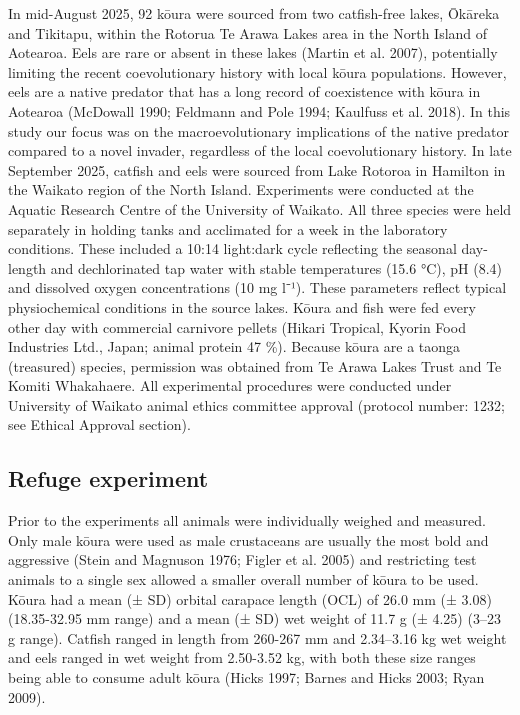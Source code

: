 \documentclass[
  12pt,
  a4paper,
  oneside]{scrbook}
\begin{document}
In mid-August 2025, 92 kōura were sourced from two catfish-free lakes,
Ōkāreka and Tikitapu, within the Rotorua Te Arawa Lakes area in the
North Island of Aotearoa. Eels are rare or absent in these lakes (Martin
et al. 2007), potentially limiting the recent coevolutionary history
with local kōura populations. However, eels are a native predator that
has a long record of coexistence with kōura in Aotearoa (McDowall 1990;
Feldmann and Pole 1994; Kaulfuss et al. 2018). In this study our focus
was on the macroevolutionary implications of the native predator
compared to a novel invader, regardless of the local coevolutionary
history. In late September 2025, catfish and eels were sourced from Lake
Rotoroa in Hamilton in the Waikato region of the North Island.
Experiments were conducted at the Aquatic Research Centre of the
University of Waikato. All three species were held separately in holding
tanks and acclimated for a week in the laboratory conditions. These
included a 10:14 light:dark cycle reflecting the seasonal day-length and
dechlorinated tap water with stable temperatures (15.6 °C), pH (8.4) and
dissolved oxygen concentrations (10 mg l⁻¹). These parameters reflect
typical physiochemical conditions in the source lakes. Kōura and fish
were fed every other day with commercial carnivore pellets (Hikari
Tropical, Kyorin Food Industries Ltd., Japan; animal protein 47 \%).
Because kōura are a taonga (treasured) species, permission was obtained
from Te Arawa Lakes Trust and Te Komiti Whakahaere. All experimental
procedures were conducted under University of Waikato animal ethics
committee approval (protocol number: 1232; see Ethical Approval
section).

\subsection{Refuge experiment}\label{refuge-experiment}

Prior to the experiments all animals were individually weighed and
measured. Only male kōura were used as male crustaceans are usually the
most bold and aggressive (Stein and Magnuson 1976; Figler et al. 2005)
and restricting test animals to a single sex allowed a smaller overall
number of kōura to be used. Kōura had a mean (± SD) orbital carapace
length (OCL) of 26.0 mm (± 3.08) (18.35-32.95 mm range) and a mean (±
SD) wet weight of 11.7 g (± 4.25) (3--23 g range). Catfish ranged in
length from 260-267 mm and 2.34--3.16 kg wet weight and eels ranged in
wet weight from 2.50-3.52 kg, with both these size ranges being able to
consume adult kōura (Hicks 1997; Barnes and Hicks 2003; Ryan 2009).
\end{document}
